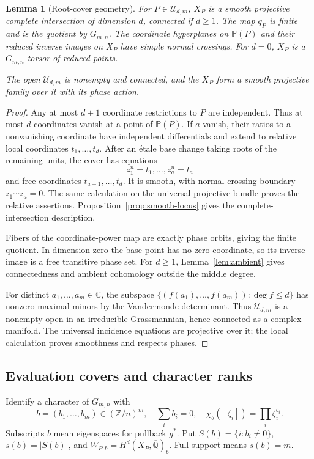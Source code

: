 \documentclass[11pt]{article}
\newcommand{\Q}{\mathbb Q}
\newcommand{\C}{\mathbb C}
\newcommand{\Z}{\mathbb Z}
\newcommand{\PP}{\mathbb P}
\newcommand{\kk}{\overline{\Q}}
\newcommand{\U}{\mathcal U}
\theoremstyle{plain}
\newtheorem{lemma}[theorem]{Lemma}
\theoremstyle{definition}
\theoremstyle{remark}
\numberwithin{equation}{section}
\begin{document}
\begin{lemma}[Root-cover geometry]\label{lem:geometry}
For \(P\in\U_{d,m}\), \(X_P\) is a smooth projective complete
intersection of dimension \(d\), connected if \(d\geq1\).
The map \(q_P\) is finite and is the quotient by \(G_{m,n}\).
The coordinate hyperplanes on \(\PP(P)\) and their reduced inverse
images on \(X_P\) have simple normal crossings.  For \(d=0\),
\(X_P\) is a \(G_{m,n}\)-torsor of reduced points.

The open \(\U_{d,m}\) is nonempty and connected, and the \(X_P\)
form a smooth projective family over it with its phase action.
\end{lemma}
\begin{proof}
Any at most \(d+1\) coordinate restrictions to \(P\) are independent.
Thus at most \(d\) coordinates vanish at a point of \(\PP(P)\).
If \(a\) vanish, their ratios to a nonvanishing coordinate have
independent differentials and extend to relative local coordinates
\(t_1,\ldots,t_d\).  After an \'{e}tale base change taking roots of
the remaining units, the cover has equations
\[
 z_1^n=t_1,\ldots,z_a^n=t_a
\]
and free coordinates \(t_{a+1},\ldots,t_d\).  It is smooth, with
normal-crossing boundary \(z_1\cdots z_a=0\).  The same calculation
on the universal projective bundle proves the relative assertions.
Proposition~\ref{prop:smooth-locus} gives the complete-intersection
description.

Fibers of the coordinate-power map are exactly phase orbits, giving
the finite quotient.  In dimension zero the base point has no zero
coordinate, so its inverse image is a free transitive phase set.
For \(d\geq1\), Lemma~\ref{lem:ambient} gives connectedness and
ambient cohomology outside the middle degree.

For distinct \(a_1,\ldots,a_m\in\C\), the subspace
\(\{(f(a_1),\ldots,f(a_m)):\deg f\leq d\}\) has nonzero maximal
minors by the Vandermonde determinant.  Thus \(\U_{d,m}\) is a
nonempty open in an irreducible Grassmannian, hence connected as a
complex manifold.  The universal incidence equations are projective
over it; the local calculation proves smoothness and respects phases.
\end{proof}

\subsection{Evaluation covers and character ranks}
Identify a character of \(G_{m,n}\) with
\[
 b=(b_1,\ldots,b_m)\in(\Z/n)^m,\quad \sum_i b_i=0,\quad
 \chi_b([\zeta_i])=\prod_i\zeta_i^{b_i}.
\]
Subscripts \(b\) mean eigenspaces for pullback \(g^*\).  Put
\(S(b)=\{i:b_i\ne0\}\), \(s(b)=|S(b)|\), and
\(W_{P,b}=H^d(X_P,\kk)_b\).  Full support means \(s(b)=m\).
\end{document}

